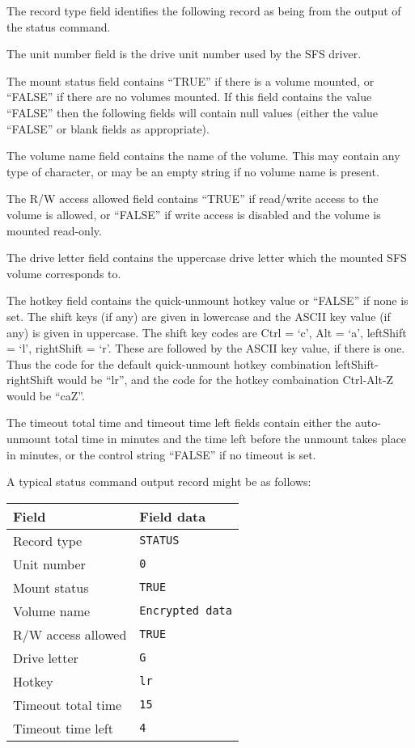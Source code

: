 The record type field identifies the following record as being from the output
of the status command.

The unit number field is the drive unit number used by the SFS driver.

The mount status field contains ``TRUE'' if there is a volume mounted, or ``FALSE''
if there are no volumes mounted.  If this field contains the value ``FALSE'' then
the following fields will contain null values (either the value ``FALSE'' or
blank fields as appropriate).

The volume name field contains the name of the volume.  This may contain any
type of character, or may be an empty string if no volume name is present.

The R/W access allowed field contains ``TRUE'' if read/write access to the volume
is allowed, or ``FALSE'' if write access is disabled and the volume is mounted
read-only.

The drive letter field contains the uppercase drive letter which the mounted
SFS volume corresponds to.

The hotkey field contains the quick-unmount hotkey value or ``FALSE'' if none is
set.  The shift keys (if any) are given in lowercase and the ASCII key value
(if any) is given in uppercase.  The shift key codes are Ctrl = `c', Alt = `a',
leftShift = `l', rightShift = `r'.  These are followed by the ASCII key value,
if there is one.  Thus the code for the default quick-unmount hotkey
combination leftShift-rightShift would be ``lr'', and the code for the hotkey
combaination Ctrl-Alt-Z would be ``caZ''.

The timeout total time and timeout time left fields contain either the
auto-unmount total time in minutes and the time left before the unmount takes
place in minutes, or the control string ``FALSE'' if no timeout is set.

A typical status command output record might be as follows:

\begin{center}
\begin{tabular}{|l|l|}
\hline
    Field                &   Field data\\
\hline
    Record type          &   {\tt STATUS}\\
    Unit number          &   {\tt 0}\\
    Mount status         &   {\tt TRUE}\\
    Volume name          &   {\tt Encrypted data}\\
    R/W access allowed   &   {\tt TRUE}\\
    Drive letter         &   {\tt G}\\
    Hotkey               &   {\tt lr}\\
    Timeout total time   &   {\tt 15}\\
    Timeout time left    &   {\tt 4}\\
\hline
\end{tabular}
\end{center}

